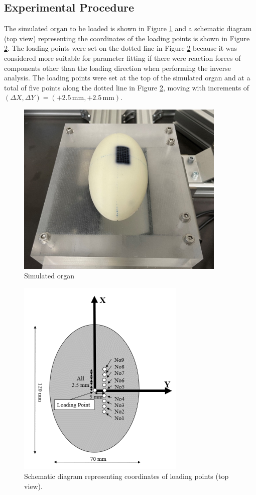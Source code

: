 \subsection*{Experimental Procedure}
The simulated organ to be loaded is shown in Figure \ref{fig:simorganynu} and a schematic diagram (top view) representing the coordinates of the loading points is shown in 
Figure \ref{fig:schemdiagynu}.
The loading points were set on the dotted line in Figure \ref{fig:schemdiagynu} because it was considered more suitable for parameter fitting if there were reaction forces of components other than the loading direction when performing the inverse analysis. The loading points were set at the top of the simulated organ and at a total of five points along the dotted line in
Figure \ref{fig:schemdiagynu}, moving with increments of $(\Delta X, \Delta Y) = (+2.5\,\mathrm{mm}, +2.5\,\mathrm{mm})$.\\
\begin{figure}%
	\centering
   \quad
   \includegraphics[width=10cm]{Images/appendix/ynu/fig2simulatedorgan.png}%
   \caption{Simulated organ}%
   \label{fig:simorganynu}%
\end{figure}
\begin{figure}%
	\centering
   \quad
   \includegraphics[width=8cm]{Images/appendix/ynu/fig3schematicdiagramrepresentingcoordinatesofloadingpoints_topview.png}%
   \caption[Schematic diagram YNU]{Schematic diagram representing coordinates of loading points (top view).}%
   \label{fig:schemdiagynu}%
\end{figure}

